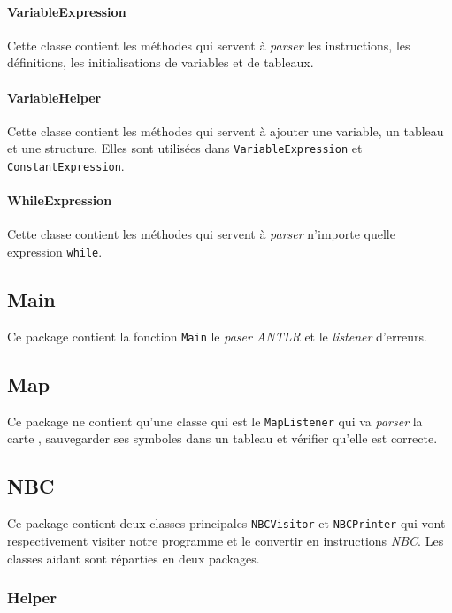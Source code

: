 \paragraph{VariableExpression}

Cette classe contient les méthodes qui servent à \emph{parser} les instructions, les définitions, les initialisations de variables et de tableaux.

\paragraph{VariableHelper}

Cette classe contient les méthodes qui servent à ajouter une variable, un tableau et une structure. Elles sont utilisées dans \texttt{VariableExpression} et \texttt{ConstantExpression}.

\paragraph{WhileExpression}

Cette classe contient les méthodes qui servent à \emph{parser} n'importe quelle expression \texttt{while}.

\subsection{Main}

Ce package contient la fonction \texttt{Main} le \emph{paser ANTLR} et le \emph{listener} d'erreurs.

\subsection{Map}

Ce package ne contient qu'une classe qui est le \texttt{MapListener} qui va \emph{parser} la carte , sauvegarder ses symboles dans un tableau et vérifier qu'elle est correcte.

\subsection{NBC}

Ce package contient deux classes principales \texttt{NBCVisitor} et \texttt{NBCPrinter} qui vont respectivement visiter notre programme et le convertir en instructions \emph{NBC}. Les classes aidant sont réparties en deux packages.

\subsubsection{Helper}

